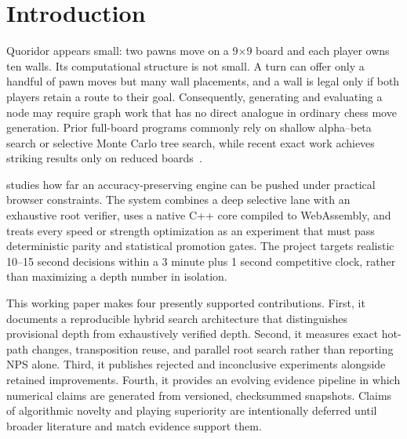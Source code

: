 \section{Introduction}
Quoridor appears small: two pawns move on a 9$\times$9 board and each player owns ten walls. Its computational structure is not small. A turn can offer only a handful of pawn moves but many wall placements, and a wall is legal only if both players retain a route to their goal. Consequently, generating and evaluating a node may require graph work that has no direct analogue in ordinary chess move generation. Prior full-board programs commonly rely on shallow alpha--beta search or selective Monte Carlo tree search, while recent exact work achieves striking results only on reduced boards~\cite{glendenning2005,slatton2026solver,gorisanson2024}.

\walwuk{} studies how far an accuracy-preserving engine can be pushed under practical browser constraints. The system combines a deep selective lane with an exhaustive root verifier, uses a native C++ core compiled to WebAssembly, and treats every speed or strength optimization as an experiment that must pass deterministic parity and statistical promotion gates. The project targets realistic 10--15 second decisions within a 3 minute plus 1 second competitive clock, rather than maximizing a depth number in isolation.

This working paper makes four presently supported contributions. First, it documents a reproducible hybrid search architecture that distinguishes provisional depth from exhaustively verified depth. Second, it measures exact hot-path changes, transposition reuse, and parallel root search rather than reporting NPS alone. Third, it publishes rejected and inconclusive experiments alongside retained improvements. Fourth, it provides an evolving evidence pipeline in which numerical claims are generated from versioned, checksummed snapshots. Claims of algorithmic novelty and playing superiority are intentionally deferred until broader literature and match evidence support them.
